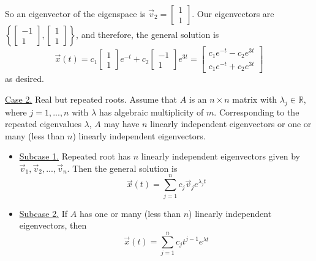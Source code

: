 \documentclass[11pt]{amsart}
\theoremstyle{definition}\newtheorem{definition}{Definition}
\theoremstyle{definition}\newtheorem{notation}{Notation}
\theoremstyle{definition}\newtheorem{example}{Example}
\theoremstyle{theorem}\newtheorem{theorem}{Theorem}
\theoremstyle{theorem}\newtheorem{corollary}{Corollary}
\theoremstyle{theorem}\newtheorem{proposition}{Proposition}
\theoremstyle{theorem}\newtheorem{lemma}{Lemma}
\theoremstyle{theorem}\newtheorem{question}{Question}
\theoremstyle{remark}\newtheorem{remark}{Remark}
\newcommand{\R}{\mathbb{R}}
\begin{document}
So an eigenvector of the eigenspace is $\vec{v}_2 = \begin{bmatrix} 1 \\ 1 \end{bmatrix}$. Our eigenvectors are $\left\{\begin{bmatrix} -1 \\ 1 \end{bmatrix}, \begin{bmatrix} 1 \\ 1 \end{bmatrix}\right\}$, and therefore, the general solution is
\begin{equation*}
    \vec{x}(t) = c_1\begin{bmatrix} 1 \\ 1 \end{bmatrix}e^{-t} + c_2\begin{bmatrix} -1 \\ 1 \end{bmatrix}e^{3t} = \begin{bmatrix} c_1e^{-t} - c_2e^{3t} \\ c_1e^{-t} + c_2e^{3t} \end{bmatrix}
\end{equation*}
as desired.

\underline{Case 2.} Real but repeated roots. Assume that $A$ is an $n \times n$ matrix with $\lambda_j \in \R$, where $j = 1,..., n$ with $\lambda$ has algebraic multiplicity of $m$. Corresponding to the repeated eigenvalues $\lambda$, $A$ may have $n$ linearly independent eigenvectors or one or many (less than $n$) linearly independent eigenvectors.
\begin{itemize}
    \item \underline{Subcase 1.} Repeated root has $n$ linearly independent eigenvectors given by $\vec{v}_1, \vec{v}_2,..., \vec{v}_n$. Then the general solution is
    \begin{equation*}
        \vec{x}(t) = \sum_{j = 1}^{n} c_j \vec{v}_j e^{\lambda_j t}
    \end{equation*}
    \item \underline{Subcase 2.} If $A$ has one or many (less than $n$) linearly independent eigenvectors, then
    \begin{equation*}
        \vec{x}(t) = \sum_{j = 1}^{n} c_j t^{j - 1}e^{\lambda t}
    \end{equation*}
\end{itemize}
\end{document}
